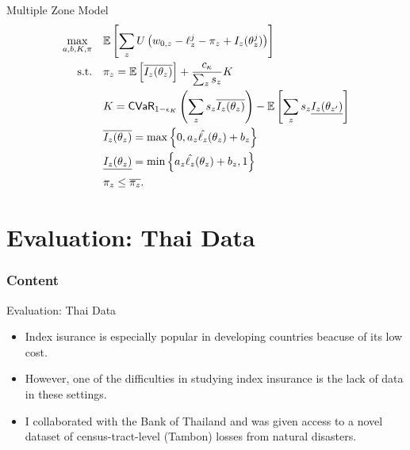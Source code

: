 \documentclass{beamer}
\begin{document}
\begin{frame}{Multiple Zone Model}
    \begin{align}
        \max_{a,b,K,\pi} &\quad \mathbb{E}\left [ \sum_z U\left ( w_{0,z} -\ell_z^j -\pi_z + I_z(\theta^j_z) \right ) \right ]\label{eq-33}\\
        \text{s.t.} &\quad \pi_z  = \mathbb{E}\left [ \overline{I_z(\theta_z)} \right ] + \frac{c_{\kappa}}{\sum_z s_z}  K\\
        &\quad K = {\sf CVaR}_{1-\epsilon_K} \left ( \sum_z s_z\overline{I_z(\theta_z)} \right ) - \mathbb{E}\left [ \sum_{z} s_{z}\underline{I_{z}(\theta_{z'})} \right ] \label{eq-32}\\
        &\quad \overline{I_z(\theta_z)} = \max \left \{0,a_z\hat{\ell_z}(\theta_z) + b_z \right \} \nonumber\\
        &\quad\underline{I_z(\theta_z)} = \min \left \{a_z\hat{\ell_z}(\theta_z)+b_z,1 \right \} \nonumber\\
        &\quad\pi_z \leq \overline{\pi_z} \nonumber.
      \end{align}
\end{frame}

\section{Evaluation: Thai Data}
\begin{frame}
    \frametitle{Content}
    \tableofcontents[currentsection]
  \end{frame}

\begin{frame}{Evaluation: Thai Data}
    \begin{itemize}
        \setlength \itemsep{2em}
        \item Index isurance is especially popular in developing countries beacuse of its low cost.
        \item However, one of the difficulties in studying index insurance is the lack of data in these settings. 
        \item I collaborated with the Bank of Thailand and was given access to a novel dataset of census-tract-level (Tambon) losses from natural disasters.
    \end{itemize}
    
\end{frame}
\end{document}
